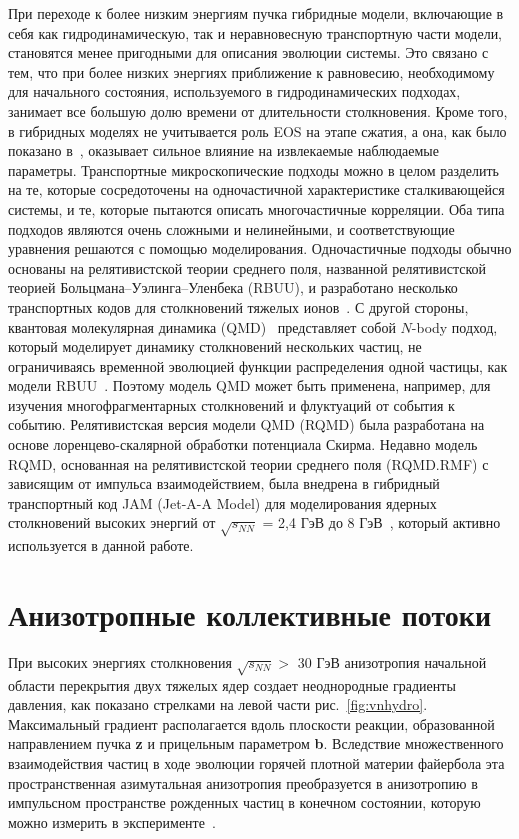 При переходе к более низким энергиям пучка гибридные модели, включающие в себя как гидродинамическую, так и неравновесную транспортную части модели, становятся менее пригодными для описания эволюции системы.
Это связано с тем, что при более низких энергиях приближение к равновесию, необходимому для начального состояния, используемого в гидродинамических подходах, занимает все большую долю времени от длительности столкновения. 
Кроме того, в гибридных моделях не учитывается роль EOS на этапе сжатия, а она, как было показано в~\cite{omana2022chiral}, оказывает сильное влияние на извлекаемые наблюдаемые параметры.
Транспортные микроскопические подходы можно в целом разделить на те, которые сосредоточены на одночастичной характеристике сталкивающейся системы, и те, которые пытаются описать многочастичные корреляции. 
Оба типа подходов являются очень сложными и нелинейными, и соответствующие уравнения решаются с помощью моделирования. 
Одночастичные подходы обычно основаны на релятивистской теории среднего поля, названной релятивистской теорией Больцмана--Уэлинга--Уленбека (RBUU), и разработано несколько транспортных кодов для столкновений тяжелых ионов~\cite{Molnar:2004yh,Xu:2004mz}.
С другой стороны, квантовая молекулярная динамика (QMD)~\cite{zhang1998theory} представляет собой $N$-body подход, который моделирует динамику столкновений нескольких частиц, не ограничиваясь временной эволюцией функции распределения одной частицы, как модели RBUU~\cite{torres2014boltzmann}. 
Поэтому модель QMD может быть применена, например, для изучения многофрагментарных столкновений и флуктуаций от события к событию. 
Релятивистская версия модели QMD (RQMD) была разработана на основе лоренцево-скалярной обработки потенциала Скирма.
Недавно модель RQMD, основанная на релятивистской теории среднего поля (RQMD.RMF) с зависящим от импульса взаимодействием, была внедрена в гибридный транспортный код JAM (Jet-A-A
Model) для моделирования ядерных столкновений высоких энергий от $\sqrt{s_{NN}}$ = 2,4 ГэВ до 8 ГэВ~\cite{Zhang:2018wlk, nara2019jam, Nara:2019qfd}, который активно используется в данной работе.

\section{Анизотропные коллективные потоки}

При высоких энергиях столкновения $\sqrt{s_{NN}}>$  30 ГэВ анизотропия начальной области перекрытия двух тяжелых ядер создает неоднородные градиенты давления, как показано стрелками на левой части рис.~\ref{fig:vnhydro}.  
Максимальный градиент располагается вдоль плоскости реакции,  образованной направлением пучка {\bf z} и прицельным параметром   {\bf b}.
Вследствие множественного взаимодействия частиц в ходе эволюции горячей плотной материи файербола эта  пространственная азимутальная анизотропия преобразуется в анизотропию в импульсном пространстве рожденных частиц в конечном состоянии, которую можно измерить в эксперименте~\cite{Voloshin:2008dg, Herrmann:1999wu}.

